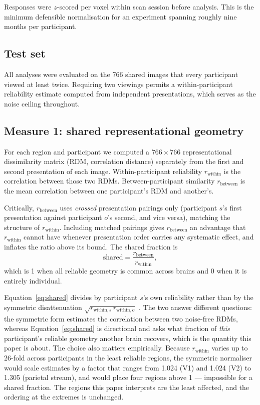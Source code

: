 \documentclass[11pt,a4paper]{article}
\begin{document}
Responses were $z$-scored per voxel within scan session before analysis. This is
the minimum defensible normalisation for an experiment spanning roughly nine
months per participant.

\subsection{Test set}

All analyses were evaluated on the 766 shared images that every participant
viewed at least twice. Requiring two viewings permits a within-participant
reliability estimate computed from independent presentations, which serves as the
noise ceiling throughout.

\subsection{Measure 1: shared representational geometry}

For each region and participant we computed a $766 \times 766$ representational
dissimilarity matrix (RDM, correlation distance) separately from the first and
second presentation of each image. Within-participant reliability
$r_{\mathrm{within}}$ is the correlation between those two RDMs.
Between-participant similarity $r_{\mathrm{between}}$ is the mean correlation
between one participant's RDM and another's.

Critically, $r_{\mathrm{between}}$ uses \emph{crossed} presentation pairings only
(participant $s$'s first presentation against participant $o$'s second, and vice
versa), matching the structure of $r_{\mathrm{within}}$. Including matched
pairings gives $r_{\mathrm{between}}$ an advantage that $r_{\mathrm{within}}$
cannot have whenever presentation order carries any systematic effect, and
inflates the ratio above its bound. The shared fraction is
\begin{equation}
\mathrm{shared} = \frac{r_{\mathrm{between}}}{r_{\mathrm{within}}},
\label{eq:shared}
\end{equation}
which is 1 when all reliable geometry is common across brains and 0 when it is
entirely individual.

Equation~\ref{eq:shared} divides by participant $s$'s own reliability rather than
by the symmetric disattenuation $\sqrt{r_{\mathrm{within},s}\,
r_{\mathrm{within},o}}$ \citep{walther2016,lagecastellanos2019}. The two answer
different questions: the symmetric form estimates the correlation between two
noise-free RDMs, whereas Equation~\ref{eq:shared} is directional and asks what
fraction of \emph{this} participant's reliable geometry another brain recovers,
which is the quantity this paper is about. The choice also matters empirically.
Because $r_{\mathrm{within}}$ varies up to 26-fold across participants in the
least reliable regions, the symmetric normaliser would scale estimates by a
factor that ranges from \num{1.024} (V1) and \num{1.024} (V2) to \num{1.305}
(parietal stream), and would place four regions above 1 --- impossible for a
shared fraction. The regions this paper interprets are the least affected, and
the ordering at the extremes is unchanged.
\end{document}
